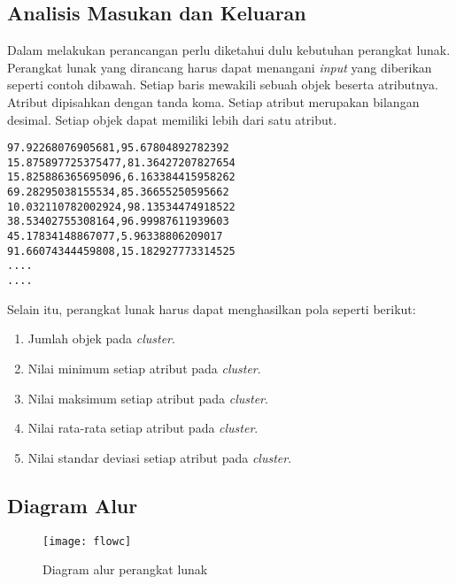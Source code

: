 \subsection{Analisis Masukan dan Keluaran}

Dalam melakukan perancangan perlu diketahui dulu kebutuhan perangkat lunak. Perangkat lunak yang dirancang harus dapat menangani \textit{input} yang diberikan seperti contoh dibawah. Setiap baris mewakili sebuah objek beserta atributnya. Atribut dipisahkan dengan tanda koma. Setiap atribut merupakan bilangan desimal. Setiap objek dapat memiliki lebih dari satu atribut.

\begin{verbatim}
97.92268076905681,95.67804892782392
15.875897725375477,81.36427207827654
15.825886365695096,6.163384415958262
69.28295038155534,85.36655250595662
10.032110782002924,98.13534474918522
38.53402755308164,96.99987611939603
45.17834148867077,5.96338806209017
91.66074344459808,15.182927773314525
....
....
\end{verbatim} 

Selain itu, perangkat lunak harus dapat menghasilkan pola seperti berikut:

\begin{enumerate}

\item Jumlah objek pada \textit{cluster}.

\item Nilai minimum setiap atribut pada \textit{cluster}.

\item Nilai maksimum setiap atribut pada \textit{cluster}.

\item Nilai rata-rata setiap atribut pada \textit{cluster}.

\item Nilai standar deviasi setiap atribut pada \textit{cluster}.
\end{enumerate}

\subsection{Diagram Alur}

\begin{figure}[H]
    \centering  
    \texttt{[image: flowc]}  
    \caption[Diagram alur perangkat lunak]{Diagram alur perangkat lunak} 
    \label{fig:flowc} 
\end{figure}

